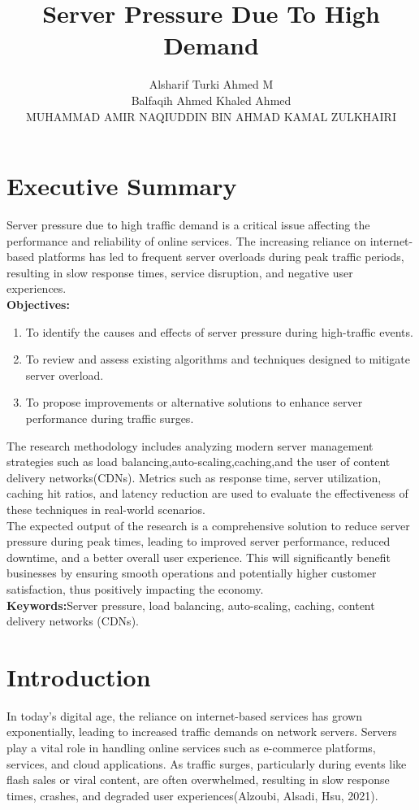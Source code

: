 \documentclass[a4paper, 12pt]{article}
\title{Server Pressure Due To High Demand}
\author{
Alsharif Turki Ahmed M  \quad  1221304497 \\
Balfaqih Ahmed Khaled Ahmed  \quad 1221304386 \\
MUHAMMAD AMIR NAQIUDDIN BIN AHMAD KAMAL ZULKHAIRI  \quad  1231302786 
}
\begin{document}
\maketitle

\section*{Executive Summary}
Server pressure due to high traffic demand is a critical issue affecting the performance and reliability of online services. 
The increasing reliance on internet-based platforms has led to frequent server overloads during peak traffic periods, resulting in slow response times, service disruption, and negative user experiences. \\

\textbf{Objectives:}

\begin{enumerate}
    \item To identify the causes and effects of server pressure during high-traffic events.
    \item To review and assess existing algorithms and techniques designed to mitigate server overload.
    \item To propose improvements or alternative solutions to enhance server performance during traffic surges.
\end{enumerate}

The research methodology includes analyzing modern server management strategies such as load balancing,auto-scaling,caching,and the user of content delivery networks(CDNs).
Metrics such as response time, server utilization, caching hit ratios, and latency reduction are used to evaluate the effectiveness of these techniques in real-world scenarios.\\


The expected output of the research is a comprehensive solution to reduce server pressure during peak times, leading to improved server performance, reduced downtime, and a better overall user experience. This will significantly benefit businesses by ensuring smooth operations and potentially higher customer satisfaction, thus positively impacting the economy.\\


\textbf{Keywords:}Server pressure, load balancing, auto-scaling, caching, content delivery networks (CDNs). 

\section{Introduction}
In today's digital age, the reliance on internet-based services has grown exponentially, leading to increased traffic demands on network servers. Servers play a vital role in handling online services such as e-commerce platforms, services, and cloud applications. As traffic surges, particularly during events like flash sales or viral content, are often overwhelmed, resulting in slow response times, crashes, and degraded user experiences(Alzoubi, Alsadi,  Hsu, 2021).\\
\end{document}

